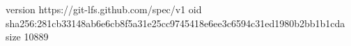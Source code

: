 version https://git-lfs.github.com/spec/v1
oid sha256:281cb33148ab6e6cb8f5a31e25cc9745418e6ee3c6594c31ed1980b2bb1b1cda
size 10889
